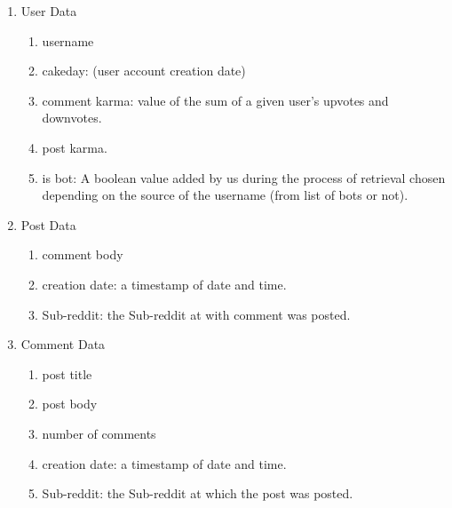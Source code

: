 \documentclass{article}
\begin{document}
    \begin{enumerate}
        \item User Data
            \begin{enumerate}
                \item username
                \item cakeday: (user account creation date)
                \item comment karma: value of the sum of a given user's upvotes and downvotes.
                \item post karma.
                \item is bot: A boolean value added by us during the process of retrieval chosen depending on the source of the username (from list of bots or not).
            \end{enumerate}
        \item Post Data
            \begin{enumerate}
                \item comment body
                \item creation date: a timestamp of date and time.
                \item Sub-reddit: the Sub-reddit at with comment was posted.
            \end{enumerate}
        \item Comment Data
            \begin{enumerate}
                \item post title
                \item post body
                \item number of comments
                \item creation date: a timestamp of date and time.
                \item Sub-reddit: the Sub-reddit at which the post was posted.
            \end{enumerate}
    \end{enumerate}

    
\end{document}
